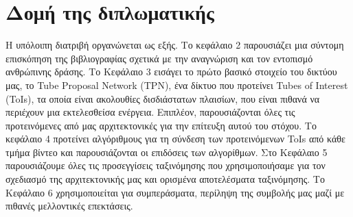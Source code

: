 \section{\gr Δομή της διπλωματικής}

Η υπόλοιπη διατριβή οργανώνεται ως εξής. Το κεφάλαιο 2  παρουσιάζει μια σύντομη επισκόπηση της βιβλιογραφίας σχετικά με την αναγνώριση και τον εντοπισμό  ανθρώπινης δράσης.
Το Κεφάλαιο 3 εισάγει το πρώτο βασικό στοιχείο του δικτύου μας, το \en Tube Proposal Network (TPN)\gr, ένα δίκτυο που προτείνει \en Tubes of Interest (ToIs)\gr,
τα οποία είναι ακολουθίες δισδιάστατων πλαισίων, που είναι πιθανά να περιέχουν μια εκτελεσθείσα ενέργεια.
Επιπλέον, παρουσιάζονται  όλες τις προτεινόμενες από μας αρχιτεκτονικές για την επίτευξη αυτού του στόχου.
Το κεφάλαιο 4 προτείνει αλγόριθμους για τη σύνδεση των προτεινόμενων \en ToIs \gr από κάθε τμήμα βίντεο και παρουσιάζονται οι επιδόσεις των αλγορίθμων.
Στο Κεφάλαιο 5 παρουσιάζουμε όλες τις προσεγγίσεις ταξινόμησης που χρησιμοποιήσαμε για τον σχεδιασμό της αρχιτεκτονικής μας και ορισμένα αποτελέσματα ταξινόμησης.
Το Κεφάλαιο 6 χρησιμοποιείται για συμπεράσματα, περίληψη της συμβολής μας μαζί με πιθανές μελλοντικές επεκτάσεις.

% 
